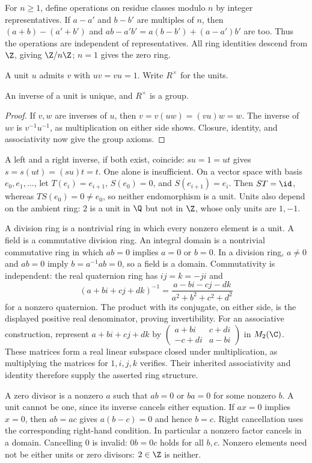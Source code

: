 For $n\ge1$, define operations on residue classes modulo $n$ by integer
representatives. If $a-a'$ and $b-b'$ are multiples of $n$, then
$(a+b)-(a'+b')$ and
$ab-a'b'=a(b-b')+(a-a')b'$ are too. Thus the operations are independent
of representatives. All ring identities descend from $\Z$, giving
$\Z/n\Z$; $n=1$ gives the zero ring.

A unit $u$ admits $v$ with $uv=vu=1$. Write $R^\times$ for the units.
\begin{proposition}\label{prop:ring-units}
An inverse of a unit is unique, and $R^\times$ is a group.
\end{proposition}
\begin{proof}
If $v,w$ are inverses of $u$, then $v=v(uw)=(vu)w=w$.
The inverse of $uv$ is $v^{-1}u^{-1}$, as multiplication on either side
shows. Closure, identity, and associativity now give the group axioms.
\end{proof}
A left and a right inverse, if both exist, coincide:
$su=1=ut$ gives $s=s(ut)=(su)t=t$. One alone is insufficient.
On a vector space with basis $e_0,e_1,\ldots$, let
$T(e_i)=e_{i+1}$, $S(e_0)=0$, and $S(e_{i+1})=e_i$.
Then $ST=\id$, whereas $TS(e_0)=0\ne e_0$, so neither endomorphism
is a unit. Units also depend on the ambient ring: $2$ is a unit in $\Q$
but not in $\Z$, whose only units are $1,-1$.

A division ring is a nontrivial ring in which every nonzero element is
a unit. A field is a commutative division ring. An integral domain is a
nontrivial commutative ring in which $ab=0$ implies $a=0$ or $b=0$.
In a division ring, $a\ne0$ and $ab=0$ imply
$b=a^{-1}ab=0$, so a field is a domain. Commutativity is independent:
the real quaternion ring has $ij=k=-ji$ and
\[
 (a+bi+cj+dk)^{-1}
 =\frac{a-bi-cj-dk}{a^2+b^2+c^2+d^2}
\]
for a nonzero quaternion. The product with its conjugate, on either side,
is the displayed positive real denominator, proving invertibility.
For an associative construction, represent $a+bi+cj+dk$ by
$\begin{pmatrix}a+bi&c+di\\-c+di&a-bi\end{pmatrix}$ in $M_2(\C)$.
These matrices form a real linear subspace closed under multiplication,
as multiplying the matrices for $1,i,j,k$ verifies. Their inherited
associativity and identity therefore supply the asserted ring structure.

A zero divisor is a nonzero $a$ such that $ab=0$ or $ba=0$ for some
nonzero $b$. A unit cannot be one, since its inverse cancels either
equation. If $ax=0$ implies $x=0$, then $ab=ac$ gives
$a(b-c)=0$ and hence $b=c$. Right cancellation uses the corresponding
right-hand condition. In particular a nonzero factor cancels in a domain.
Cancelling $0$ is invalid: $0b=0c$ holds for all $b,c$.
Nonzero elements need not be either units or zero divisors: $2\in\Z$
is neither.

